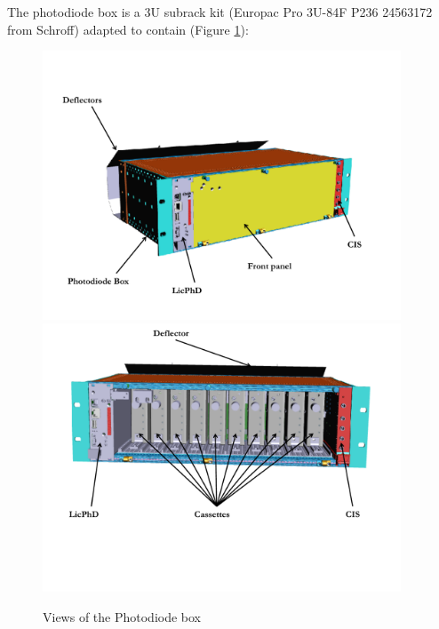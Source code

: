 

The photodiode box is a 3U subrack kit (Europac Pro 3U-84F P236 24563172 from Schroff) adapted to contain (Figure \ref{fig:lasphotodiodebox}):

\begin{figure}[htbp]
\centering
\includegraphics[height=8cm]{figures/Photodiodebox.pdf}
\includegraphics[height=8cm]{figures/Photodiodebox2.pdf}
\caption{Views of the Photodiode box}\label{fig:lasphotodiodebox}
\end{figure}

